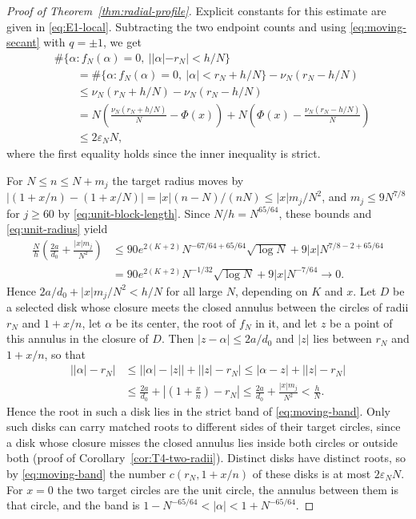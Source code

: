 \begin{proof}[Proof of Theorem~\ref{thm:radial-profile}]
Explicit constants for this estimate are given in \eqref{eq:E1-local}.
Subtracting the two endpoint counts and using \eqref{eq:moving-secant}
with $q=\pm1$, we get
\begin{align}
 &\#\{\alpha:f_N(\alpha)=0,\ ||\alpha|-r_N|<h/N\}\nonumber\\
 &\qquad=\#\{\alpha:f_N(\alpha)=0,\ |\alpha|<r_N+h/N\}-\nu_N(r_N-h/N)\nonumber\\
 &\qquad\le\nu_N(r_N+h/N)-\nu_N(r_N-h/N)\nonumber\\
 &\qquad=N\left(\frac{\nu_N(r_N+h/N)}N-\Phi(x)\right)
   +N\left(\Phi(x)-\frac{\nu_N(r_N-h/N)}N\right)\nonumber\\
 &\qquad\le2\varepsilon_NN,
 \label{eq:moving-band}
\end{align}
where the first equality holds since the inner inequality is strict.

For $N\le n\le N+m_j$ the target radius moves by
$|(1+x/n)-(1+x/N)|=|x|(n-N)/(nN)\le|x|m_j/N^2$, and $m_j\le9N^{7/8}$ for
$j\ge60$ by \eqref{eq:unit-block-length}. Since $N/h=N^{65/64}$, these
bounds and \eqref{eq:unit-radius} yield
\begin{equation}
 \begin{aligned}
 \frac Nh\left(\frac{2a}{d_0}+\frac{|x|m_j}{N^2}\right)
 &\le90e^{2(K+2)}N^{-67/64+65/64}\sqrt{\log N}+9|x|N^{7/8-2+65/64}\\
 &=90e^{2(K+2)}N^{-1/32}\sqrt{\log N}+9|x|N^{-7/64}
 \longrightarrow0.
 \end{aligned}
 \label{eq:unit-radius-ratio}
\end{equation}
Hence $2a/d_0+|x|m_j/N^2<h/N$ for all large $N$, depending on $K$ and
$x$. Let $D$ be a selected disk whose closure meets the closed annulus
between the circles of radii $r_N$ and $1+x/n$, let $\alpha$ be its
center, the root of $f_N$ in it, and let $z$ be a point of this annulus
in the closure of $D$. Then $|z-\alpha|\le2a/d_0$ and $|z|$ lies between
$r_N$ and $1+x/n$, so that
\begin{align*}
 \bigl||\alpha|-r_N\bigr|
 &\le\bigl||\alpha|-|z|\bigr|+\bigl||z|-r_N\bigr|
 \le|\alpha-z|+\bigl||z|-r_N\bigr|\\
 &\le\frac{2a}{d_0}+\left|\left(1+\frac xn\right)-r_N\right|
 \le\frac{2a}{d_0}+\frac{|x|m_j}{N^2}<\frac hN.
\end{align*}
Hence the root in such a disk lies in the strict band of
\eqref{eq:moving-band}. Only such disks can carry matched roots to
different sides of their target circles, since a disk whose closure
misses the closed annulus lies inside both circles or outside both
(proof of Corollary~\ref{cor:T4-two-radii}). Distinct disks have
distinct roots, so by \eqref{eq:moving-band} the number
$c(r_N,1+x/n)$ of these disks is at most $2\varepsilon_NN$.
For $x=0$ the two target circles are the unit circle, the annulus
between them is that circle, and the band is
$1-N^{-65/64}<|\alpha|<1+N^{-65/64}$.


\end{proof}
